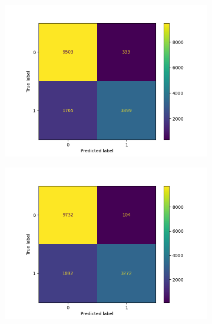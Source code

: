 \begin{figure}
\begin{subfigure}[b]{0.245\textwidth}
            \centering
            \includegraphics[scale=0.35]{"../figs/fig_content_title/fig_ngramKNN_2k=7_content_title.png"}
            \caption{}
        \end{subfigure}
        \begin{subfigure}[b]{0.245\textwidth}  
            \centering 
            \includegraphics[scale=0.35]{"../figs/fig_content_title/fig_ngramKNN_2k=10_content_title.png"}
            \caption{}
        \end{subfigure}
        \begin{subfigure}[b]{0.245\textwidth}  
            \centering 

\end{subfigure}
\end{figure}
